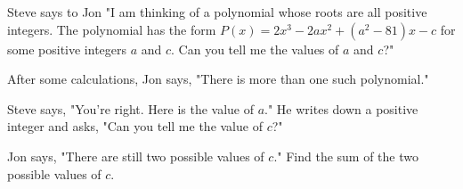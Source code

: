 Steve says to Jon "I am thinking of a polynomial whose roots are all positive integers. The polynomial has the form $P(x)=2x^{3}-2ax^{2}+(a^{2}-81)x-c$ for some positive integers $a$ and $c$. Can you tell me the values of $a$ and $c$?"

After some calculations, Jon says, "There is more than one such polynomial."

Steve says, "You're right. Here is the value of $a$." He writes down a positive integer and asks, "Can you tell me the value of $c$?"

Jon says, "There are still two possible values of $c$." Find the sum of the two possible values of $c$.
